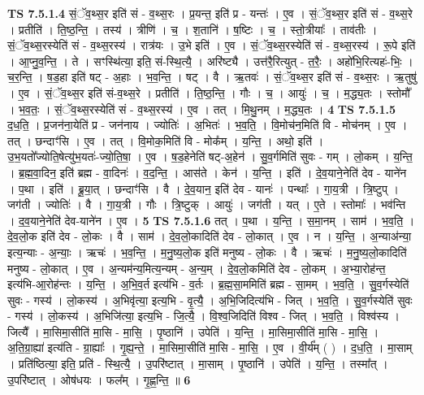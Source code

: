 \documentclass[17pt]{extarticle}
\begin{document}
                  \newline
                                \textbf{ TS 7.5.1.4} \newline
                  सं॒ॅव॒थ्स॒र इति॑ सं - व॒थ्स॒रः । प्र॒यन्त॒ इति॑ प्र - यन्तः॑ । ए॒व । सं॒ॅव॒थ्स॒र इति॑ सं - व॒थ्स॒रे । प्रतीति॑ । ति॒ष्ठ॒न्ति॒ । तस्य॑ । त्रीणि॑ । च॒ । श॒तानि॑ । ष॒ष्टिः । च॒ । स्तो॒त्रीयाः᳚ । ताव॑तीः । सं॒ॅव॒थ्स॒रस्येति॑ सं - व॒थ्स॒रस्य॑ । रात्र॑यः । उ॒भे इति॑ । ए॒व । सं॒ॅव॒थ्स॒रस्येति॑ सं - व॒थ्स॒रस्य॑ । रू॒पे इति॑ । आ॒प्नु॒व॒न्ति॒ । ते । सꣳस्थि॑त्या॒ इति॒ सं-स्थि॒त्यै॒ । अरि॑ष्ट्यै । उत्त॑रै॒रित्युत् - त॒रैः॒ । अहो॑भि॒रित्यहः॑-भिः॒ । च॒र॒न्ति॒ । ष॒ड॒हा इति॑ षट् - अ॒हाः । भ॒व॒न्ति॒ । षट् । वै । ऋ॒तवः॑ । सं॒ॅव॒थ्स॒र इति॑ सं - व॒थ्स॒रः । ऋ॒तुषु॑ । ए॒व । सं॒ॅव॒थ्स॒र इति॑ सं-व॒थ्स॒रे । प्रतीति॑ । ति॒ष्ठ॒न्ति॒ । गौः । च॒ । आयुः॑ । च॒ । म॒द्ध्य॒तः । स्तोमौ᳚ । भ॒व॒तः॒ । सं॒ॅव॒थ्स॒रस्येति॑ सं - व॒थ्स॒रस्य॑ । ए॒व । तत् । मि॒थु॒नम् । म॒द्ध्य॒तः । \textbf{  4} \newline
                  \newline
                                \textbf{ TS 7.5.1.5} \newline
                  द॒ध॒ति॒ । प्र॒जन॑ना॒येति॑ प्र - जन॑नाय । ज्योतिः॑ । अ॒भितः॑ । भ॒व॒ति॒ । वि॒मोच॑न॒मिति॑ वि - मोच॑नम् । ए॒व । तत् । छन्दाꣳ॑सि । ए॒व । तत् । वि॒मोक॒मिति॑ वि - मोक᳚म् । य॒न्ति॒ । अथो॒ इति॑ । उ॒भ॒यतो᳚ज्योति॒षेत्यु॑भ॒यतः॑-ज्यो॒ति॒षा॒ । ए॒व । ष॒ड॒हेनेति॑ षट्-अ॒हेन॑ । सु॒व॒र्गमिति॑ सुवः - गम् । लो॒कम् । य॒न्ति॒ । ब्र॒ह्म॒वा॒दिन॒ इति॑ ब्रह्म - वा॒दिनः॑ । व॒द॒न्ति॒ । आस॑ते । केन॑ । य॒न्ति॒ । इति॑ । दे॒व॒याने॒नेति॑ देव - याने॑न । प॒था । इति॑ । ब्रू॒या॒त् । छन्दाꣳ॑सि । वै । दे॒व॒यान॒ इति॑ देव - यानः॑ । पन्थाः᳚ । गा॒य॒त्री । त्रि॒ष्टुप् । जग॑ती । ज्योतिः॑ । वै । गा॒य॒त्री । गौः । त्रि॒ष्टुक् । आयुः॑ । जग॑ती । यत् । ए॒ते । स्तोमाः᳚ । भव॑न्ति । द॒व॒याने॒नेति॑ देव-याने॑न । ए॒व । \textbf{  5} \newline
                  \newline
                                \textbf{ TS 7.5.1.6} \newline
                  तत् । प॒था । य॒न्ति॒ । स॒मा॒नम् । साम॑ । भ॒व॒ति॒ । दे॒व॒लो॒क इति॑ देव - लो॒कः । वै । साम॑ । दे॒व॒लो॒कादिति॑ देव - लो॒कात् । ए॒व । न । य॒न्ति॒ । अ॒न्या‌अ॑न्या॒ इत्य॒न्याः - अ॒न्याः॒ । ऋचः॑ । भ॒व॒न्ति॒ । म॒नु॒ष्य॒लो॒क इति॑ मनुष्य - लो॒कः । वै । ऋचः॑ । म॒नु॒ष्य॒लो॒कादिति॑ मनुष्य - लो॒कात् । ए॒व । अ॒न्यम॑न्य॒मित्य॒न्यम् - अ॒न्य॒म् । दे॒व॒लो॒कमिति॑ देव - लो॒कम् । अ॒भ्या॒रोह॑न्त॒ इत्य॑भि-आ॒रोह॑न्तः । य॒न्ति॒ । अ॒भि॒व॒र्त इत्य॑भि  -  व॒र्तः । ब्र॒ह्म॒सा॒ममिति॑ ब्रह्म - सा॒मम् । भ॒व॒ति॒ । सु॒व॒र्गस्येति॑ सुवः - गस्य॑ । लो॒कस्य॑ । अ॒भिवृ॑त्या॒ इत्य॒भि - वृ॒त्यै॒ । अ॒भि॒जिदित्य॑भि - जित् । भ॒व॒ति॒ । सु॒व॒र्गस्येति॑ सुवः - गस्य॑ । लो॒कस्य॑ । अ॒भिजि॑त्या॒ इत्य॒भि - जि॒त्यै॒ । वि॒श्व॒जिदिति॑ विश्व - जित् । भ॒व॒ति॒ । विश्व॑स्य । जित्यै᳚ । मा॒सिमा॒सीति॑ मा॒सि - मा॒सि॒ । पृ॒ष्ठानि॑ । उपेति॑ । य॒न्ति॒ । मा॒सिमा॒सीति॑ मा॒सि - मा॒सि॒ । अ॒ति॒ग्रा॒ह्या॑ इत्य॑ति - ग्रा॒ह्याः᳚ । गृ॒ह्य॒न्ते॒ । मा॒सिमा॒सीति॑ मा॒सि - मा॒सि॒ । ए॒व । वी॒र्य᳚म् ( ) । द॒ध॒ति॒ । मा॒साम् । प्रति॑ष्ठित्या॒ इति॒ प्रति॑ - स्थि॒त्यै॒ । उ॒परि॑ष्टात् । मा॒साम् । पृ॒ष्ठानि॑ । उपेति॑ । य॒न्ति॒ । तस्मा᳚त् । उ॒परि॑ष्टात् । ओष॑धयः । फल᳚म् । गृ॒ह्ण॒न्ति॒ ॥ \textbf{  6 } \newline
\end{document}
